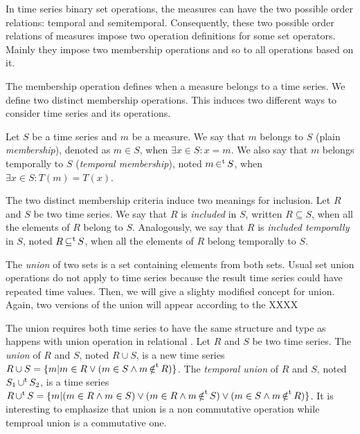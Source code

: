 In time series binary set operations, the measures can have the two
possible order relations: temporal and semitemporal. Consequently,
these two possible order relations of measures impose two operation
definitions for some set operators.  Mainly they impose two membership
operations and so to all operations based on it.

The membership operation defines when a measure belongs to a time
series. We define two distinct membership operations. This induces two
different ways to consider time series and its operations.


Let $S$ be a time series and $m$ be a measure. 
%
We say that $m$ belongs to $S$ (plain \emph{membership}), denoted as
$m \in S$, when $\exists x\in S: x=m$.  We also say that $m$ belongs
temporally to $S$ (\emph{temporal membership}), noted $m \operatorname*{\in^t} S$,
when $\exists x\in S : T(m)=T(x)$.


The two distinct membership criteria induce two meanings for
inclusion. Let $R$ and $S$ be two time series.  We say that $R$ is
\emph{included} in $S$, written $R\subseteq S$, when all the elements
of $R$ belong to $S$.  Analogously, we say that $R$ is \emph{included
  temporally} in $S$, noted $R\operatorname*{\subseteq^t} S$, when all the elements of
$R$ belong temporally to $S$.


The \emph{union} of two sets is a set containing elements from both
sets. Usual set union operations do not apply to time series because
the result time series could have repeated time values.  Then, we will
give a slighty modified concept for union.
Again, two versions of the union will appear according to the 
XXXX
%

The union requires both time series to have the same structure and
type as happens with union operation in relational 
\cite{date:introduction}.
%
Let $R$ and $S$ be two time series. 
%
The \emph{union} of $R$ and $S$, noted $R\cup S$, is a new time series
$R \cup S = \{m|m\in R\vee (m\in S\wedge m \operatorname*{\notin^t} R)\}$. 
%
The \emph{temporal union} of $R$ and $S$, noted $S_1 \operatorname*{\cup^t} S_2$, is a
time series $R \operatorname*{\cup^t} S = \{ m | (m \in R \wedge m \in S) \vee (m \in R
\wedge m \operatorname*{\notin^t} S) \vee (m \in S \wedge m \operatorname*{\notin^t} R) \}$.  
%
It is interesting to emphasize that union is a non commutative
operation while temproal union is a commutative one.

